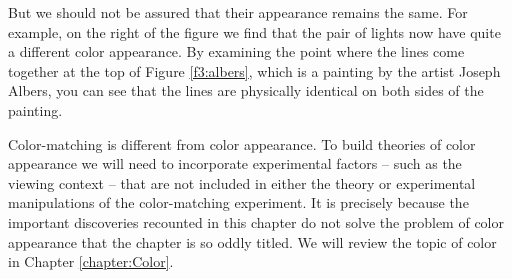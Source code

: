 But we should not be assured that their appearance
remains the same.
For example, on the right of the figure we find that the
pair of lights
now have quite a different color appearance.
By examining the point where the
lines come together at the top
of Figure \ref{f3:albers},
which is a painting by the artist Joseph Albers,
you can see that the lines are physically identical
on both sides of the painting.

Color-matching is different from color appearance.
To build theories of color appearance
we will need to
incorporate experimental factors -- such as the viewing context --
that are not included in either the theory or experimental
manipulations of the color-matching experiment.
It is precisely because the important discoveries
recounted in this chapter do not solve the problem of color appearance
that the chapter is so oddly titled.
We will review the topic of color in Chapter \ref{chapter:Color}.
